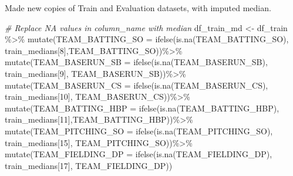 \documentclass[
]{article}
\newenvironment{Shaded}{\begin{snugshade}}{\end{snugshade}}
\newcommand{\AttributeTok}[1]{\textcolor[rgb]{0.77,0.63,0.00}{#1}}
\newcommand{\CommentTok}[1]{\textcolor[rgb]{0.56,0.35,0.01}{\textit{#1}}}
\newcommand{\DecValTok}[1]{\textcolor[rgb]{0.00,0.00,0.81}{#1}}
\newcommand{\FunctionTok}[1]{\textcolor[rgb]{0.00,0.00,0.00}{#1}}
\newcommand{\NormalTok}[1]{#1}
\newcommand{\OtherTok}[1]{\textcolor[rgb]{0.56,0.35,0.01}{#1}}
\newcommand{\SpecialCharTok}[1]{\textcolor[rgb]{0.00,0.00,0.00}{#1}}
\begin{document}
Made new copies of Train and Evaluation datasets, with imputed median.

\begin{Shaded}
\begin{Highlighting}[]
\CommentTok{\# Replace NA values in \textquotesingle{}column\_name\textquotesingle{} with \textquotesingle{}median\textquotesingle{}}
\NormalTok{df\_train\_md }\OtherTok{\textless{}{-}}\NormalTok{ df\_train }\SpecialCharTok{\%\textgreater{}\%}
  \FunctionTok{mutate}\NormalTok{(}\AttributeTok{TEAM\_BATTING\_SO =}
           \FunctionTok{ifelse}\NormalTok{(}\FunctionTok{is.na}\NormalTok{(TEAM\_BATTING\_SO),}
\NormalTok{                  train\_medians[}\DecValTok{8}\NormalTok{],TEAM\_BATTING\_SO))}\SpecialCharTok{\%\textgreater{}\%}
  \FunctionTok{mutate}\NormalTok{(}\AttributeTok{TEAM\_BASERUN\_SB =}
           \FunctionTok{ifelse}\NormalTok{(}\FunctionTok{is.na}\NormalTok{(TEAM\_BASERUN\_SB),}
\NormalTok{                  train\_medians[}\DecValTok{9}\NormalTok{], TEAM\_BASERUN\_SB))}\SpecialCharTok{\%\textgreater{}\%}
  \FunctionTok{mutate}\NormalTok{(}\AttributeTok{TEAM\_BASERUN\_CS =}
           \FunctionTok{ifelse}\NormalTok{(}\FunctionTok{is.na}\NormalTok{(TEAM\_BASERUN\_CS),}
\NormalTok{                  train\_medians[}\DecValTok{10}\NormalTok{], TEAM\_BASERUN\_CS))}\SpecialCharTok{\%\textgreater{}\%}
  \FunctionTok{mutate}\NormalTok{(}\AttributeTok{TEAM\_BATTING\_HBP =}
           \FunctionTok{ifelse}\NormalTok{(}\FunctionTok{is.na}\NormalTok{(TEAM\_BATTING\_HBP),}
\NormalTok{                  train\_medians[}\DecValTok{11}\NormalTok{],TEAM\_BATTING\_HBP))}\SpecialCharTok{\%\textgreater{}\%}
  \FunctionTok{mutate}\NormalTok{(}\AttributeTok{TEAM\_PITCHING\_SO =}
           \FunctionTok{ifelse}\NormalTok{(}\FunctionTok{is.na}\NormalTok{(TEAM\_PITCHING\_SO),}
\NormalTok{                  train\_medians[}\DecValTok{15}\NormalTok{], TEAM\_PITCHING\_SO))}\SpecialCharTok{\%\textgreater{}\%}
  \FunctionTok{mutate}\NormalTok{(}\AttributeTok{TEAM\_FIELDING\_DP =}
           \FunctionTok{ifelse}\NormalTok{(}\FunctionTok{is.na}\NormalTok{(TEAM\_FIELDING\_DP),}
\NormalTok{                  train\_medians[}\DecValTok{17}\NormalTok{], TEAM\_FIELDING\_DP))}
\end{Highlighting}
\end{Shaded}
\end{document}
